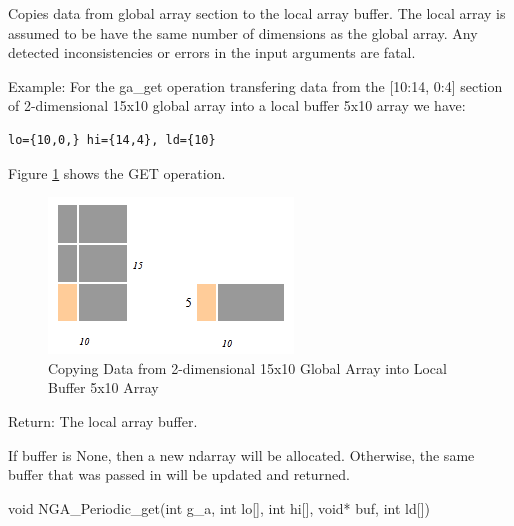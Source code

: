 \documentclass[10pt]{article}
\begin{document}
\begin{desc}

Copies data from global array section to the local array buffer. The local
array is assumed to be have the same number of dimensions as the global array.
Any detected inconsistencies or errors in the input arguments are fatal.

Example: For the ga_get operation transfering data from the [10:14, 0:4]
section of 2-dimensional 15x10 global array into a local buffer 5x10 array we
have:

\begin{verbatim}
lo={10,0,} hi={14,4}, ld={10}
\end{verbatim}

Figure \ref{get} shows the GET operation.

\begin{figure}
\centering
\includegraphics{get}
\caption{Copying Data from 2-dimensional 15x10 Global Array into Local Buffer 5x10 Array}
\label{get}
\end{figure}

Return: The local array buffer.

\end{desc}

\begin{pydesc}
If buffer is None, then a new ndarray will be allocated. Otherwise, the same
buffer that was passed in will be updated and returned.
\end{pydesc}


\begin{capi}
\begin{ccode}
void NGA_Periodic_get(int g_a, int lo[], int hi[], void* buf, int ld[])
\end{ccode}
\begin{funcargs}
\end{funcargs}
\end{capi}
\end{document}
